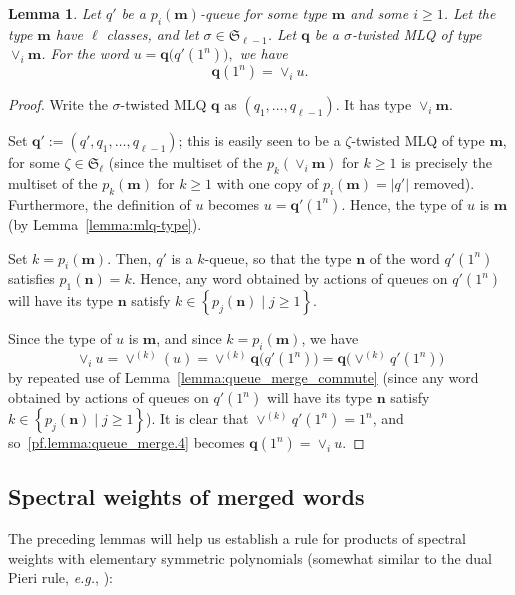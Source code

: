 \documentclass[reqno]{amsart}
\newcommand{\0}{\phantom{c}}
\newcommand{\merge}[1]{\vee_{#1}} %
\newcommand{\SymGp}[1]{\mathfrak{S}_{#1}} %
\newcommand{\mm}{\mathbf{m}}
\newcommand{\nn}{\mathbf{n}}
\newcommand{\qq}{\mathbf{q}}
\newcommand{\set}[1]{\left\{ #1 \right\}}
\newcommand{\abs}[1]{\left| #1 \right|}
\newcommand{\tup}[1]{\left( #1 \right)}
\theoremstyle{plain}
\newtheorem{lemma}[thm]{Lemma}
\theoremstyle{definition}
\numberwithin{equation}{section}
\begin{document}
\begin{lemma}
\label{lemma:queue_merge}
  Let $q'$ be a $p_i(\mm)$-queue for some type $\mm$ and some $i \geq 1$.
  Let the type $\mm$ have $\ell$ classes, and let $\sigma \in \SymGp{\ell-1}$.
  Let $\qq$ be a $\sigma$-twisted MLQ of type $\merge{i}\mm$.
  For the word
  $
  u = \qq\bigl( q'(1^n) \bigr),
  $
  we have
  \[
  \qq(1^n) = \merge{i} u.
  \]
\end{lemma}

\begin{proof}
Write the $\sigma$-twisted MLQ $\qq$ as $\tup{q_1, \ldots, q_{\ell-1}}$.
It has type $\merge{i} \mm$.

Set $\qq' := \tup{q', q_1, \ldots, q_{\ell-1}}$; this is easily
seen to be a $\zeta$-twisted MLQ of type $\mm$, for some
$\zeta \in \SymGp{\ell}$
(since the multiset of the $p_k(\merge{i}\mm)$ for $k \geq 1$
is precisely the multiset of the $p_k(\mm)$ for $k \geq 1$
with one copy of $p_i(\mm) = \abs{q'}$ removed).
Furthermore, the definition of $u$ becomes $u = \qq' (1^n)$.
Hence, the type of $u$ is $\mm$ (by Lemma~\ref{lemma:mlq-type}).

Set $k = p_i(\mm)$. Then, $q'$ is a $k$-queue, so that the type
$\nn$ of the word $q'(1^n)$ satisfies $p_1(\nn) = k$.
Hence, any word obtained by actions of queues on $q'(1^n)$
will have its type $\nn$ satisfy
$k \in \set{ p_j(\nn) \mid j \geq 1 } $.

Since the type of $u$ is $\mm$, and since $k = p_i(\mm)$, we have
\begin{equation}
\label{pf.lemma:queue_merge.4}
 \merge{i} u = \vee^{(k)} (u) = \vee^{(k)} \qq\bigl( q' (1^n) \bigr) = \qq\bigl( \vee^{(k)} q' (1^n) \bigr)
\end{equation}
by repeated use of Lemma~\ref{lemma:queue_merge_commute}
(since any word obtained by actions of queues on $q'(1^n)$
will have its type $\nn$ satisfy
$k \in \set{ p_j(\nn) \mid j \geq 1 } $).
It is clear that $\vee^{(k)} q'(1^n) = 1^n$,
and so~\eqref{pf.lemma:queue_merge.4} becomes $\qq(1^n) = \merge{i} u$.
\end{proof}

\subsection{Spectral weights of merged words}

The preceding lemmas will help us establish a rule for products of spectral weights with elementary symmetric polynomials (somewhat similar to the dual Pieri rule, \textit{e.g.}, \cite[Section 7.15]{Stanley-EC2}):
\end{document}
